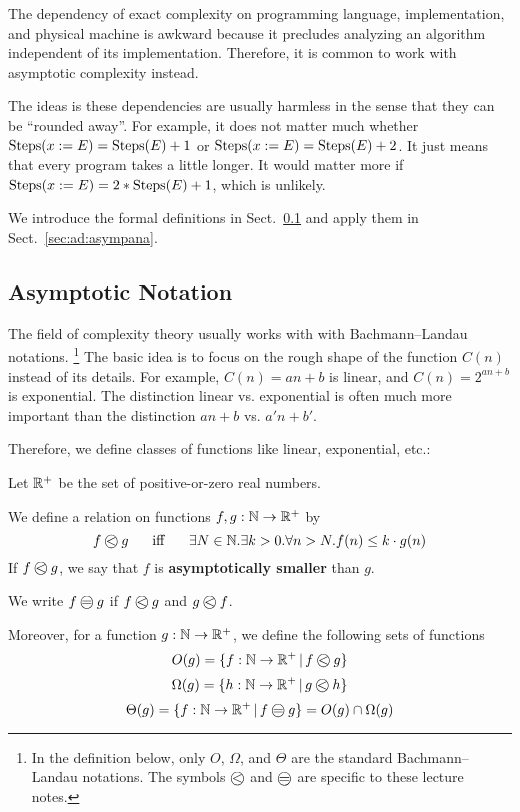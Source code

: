 The dependency of exact complexity on programming language, implementation, and physical machine is awkward because it precludes analyzing an algorithm independent of its implementation.
Therefore, it is common to work with asymptotic complexity instead.

The ideas is these dependencies are usually harmless in the sense that they can be ``rounded away''.
For example, it does not matter much whether $\mathrm{Steps}(x:=E)=\mathrm{Steps}(E)+1$ or $\mathrm{Steps}(x:=E)=\mathrm{Steps}(E)+2$.
It just means that every program takes a little longer.
It would matter more if $\mathrm{Steps}(x:=E)=2*\mathrm{Steps}(E)+1$, which is unlikely.

We introduce the formal definitions in Sect.~\ref{sec:ad:onot} and apply them in Sect.~\ref{sec:ad:asympana}.

\subsection{Asymptotic Notation}\label{sec:ad:onot}

The field of complexity theory usually works with with Bachmann–Landau notations.%
\footnote{In the definition below, only $O$, $\Omega$, and $\Theta$ are the standard Bachmann–Landau notations. The symbols $\Oleq{}{}$ and $\Oeq{}{}$ are specific to these lecture notes.}
The basic idea is to focus on the rough shape of the function $C(n)$ instead of its details.
For example, $C(n)=an+b$ is linear, and $C(n)=2^{an+b}$ is exponential.
The distinction linear vs. exponential is often much more important than the distinction $an+b$ vs. $a'n+b'$. 

Therefore, we define classes of functions like linear, exponential, etc.:

\begin{definition}[O-Notation]\label{def:ad:onot}
Let $\mathbb{R}^+$ be the set of positive-or-zero real numbers.

We define a relation on functions $f,g:\mathbb{N}\to\mathbb{R}^+$ by
\[\Oleq{f}{g} \tb\miff\tb \exists N\in\N.\exists k>0.  \forall n>N. f(n)\leq k\cdot g(n)\]
If $\Oleq{f}{g}$, we say that $f$ is \textbf{asymptotically smaller} than $g$.

We write $\Oeq{f}{g}$ if $\Oleq{f}{g}$ and $\Oleq{g}{f}$.

Moreover, for a function $g:\mathbb{N}\to\mathbb{R}^+$, we define the following sets of functions
\[O(g) = \{f:\N\to\R^+\,|\, \Oleq{f}{g}\}\]
\[\Omega(g) = \{h:\N\to\R^+\,|\, \Oleq{g}{h}\}\]
\[\Theta(g) = \{f:\N\to\R^+\,|\, \Oeq{f}{g} \} = O(g)\cap\Omega(g)\]
\end{definition}


